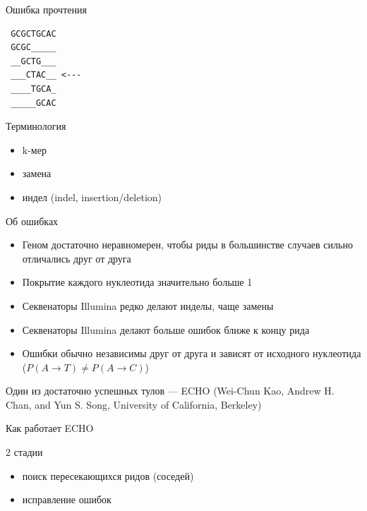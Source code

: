 \documentclass[10pt]{beamer}
\begin{document}
\begin{frame}[fragile]{Ошибка прочтения}
\begin{verbatim}
 GCGCTGCAC
 GCGC_____
 __GCTG___
 ___CTAC__ <---
 ____TGCA_
 _____GCAC
\end{verbatim}
\end{frame}

\begin{frame}{Терминология}
  \begin{itemize}
  \item k-мер
  \item замена
  \item индел (indel, insertion/deletion)
  \end{itemize}
\end{frame}


\begin{frame}{Об ошибках}
  \begin{itemize}
  \item Геном достаточно неравномерен, чтобы риды в большинстве
    случаев сильно отличались друг от друга
  \item Покрытие каждого нуклеотида значительно больше 1
  \item Секвенаторы Illumina редко делают инделы, чаще замены
  \item Секвенаторы Illumina делают больше ошибок ближе к концу рида
  \item Ошибки обычно независимы друг от друга и зависят от исходного
    нуклеотида ($P(A→T) \neq P(A→C)$)
  \end{itemize}
  Один из достаточно успешных тулов — ECHO (Wei-Chun Kao, Andrew
  H. Chan, and Yun S. Song, University of California, Berkeley)
\end{frame}


\begin{frame}
  \begin{center}
    \Large
    Как работает ECHO
  \end{center}
\end{frame}

\begin{frame}{2 стадии}
  \begin{itemize}
  \item поиск пересекающихся ридов (соседей)
  \item исправление ошибок
  \end{itemize}
\end{frame}
\end{document}

